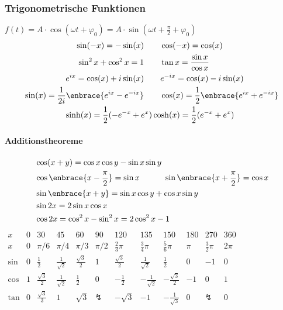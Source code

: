 \documentclass[german]{latex4ei/latex4ei_sheet}
\begin{document}
\begin{sectionbox}
    \subsubsection{Trigonometrische Funktionen}
    $f(t)=A\cdot \cos(\omega t + \varphi_0)=A\cdot \sin(\omega t + \frac{\pi}{2}+ \varphi_0)$
    \begin{eqnarray*}
        \sin (-x) = -\sin (x)  \quad & \quad \cos (-x) = \cos (x) \\
        \sin^2 x + \cos^2 x = 1  \quad & \quad \tan x = \frac{\sin x}{\cos x} \\
        e^{ix}=\cos(x)+i\sin(x) \quad & \quad e^{-ix}=\cos(x)-i\sin(x) \\
        \sin(x)=\frac{1}{2i}\enbrace{e^{ix}-e^{-ix}} \quad & \quad \cos(x)=\frac{1}{2}\enbrace{e^{ix}+e^{-ix}} \\
        \sinh(x)=\frac{1}{2}(-e^{-x}+e^x) & \cosh(x)=\frac{1}{2}(e^{-x}+e^x)
    \end{eqnarray*}
    \paragraph{Additionstheoreme} %
    \label{par:additionstheoreme}
     \begin{eqnarray*}
         & \cos (x + y) = \cos x \cos y - \sin x \sin y \\
        & \cos \enbrace{x - \frac{\pi}{2}} = \sin x \qquad \quad \sin \enbrace{x + \frac{\pi}{2}} = \cos x \\
        & \sin \enbrace{x + y} = \sin x \cos y + \cos x \sin y \\
    & 	\sin 2x = 2 \sin x \cos x        \\
        & \cos 2x = \cos^2 x - \sin^2 x = 2\cos^2 x - 1\\
     \end{eqnarray*}
    \hspace{-20pt}
    \scalebox{0.77}
    {
    $\begin{array}{c|c|c|c|c|c|c|c|c|c|c|c}
    x & 0& 30 & 45& 60 & 90 & 120 & 135& 150& 180 & 270 & 360 \\ \hline
    x & 0 & \pi / 6 & \pi / 4 & \pi / 3 & \pi / 2 & \frac{2}{3}\pi& \frac{3}{4}\pi& \frac{5}{6}\pi& \pi  & \frac{3}{2}\pi & 2 \pi \\ \hline
    \sin & 0 & \frac{1}{2} & \frac{1}{\sqrt{2}} & \frac{\sqrt 3}{2} & 1 & \frac{\sqrt 3}{2} & \frac{1}{\sqrt{2}} & \frac{1}{2} & 0 & -1 & 0 \\
    \cos & 1 & \frac{\sqrt 3}{2} & \frac{1}{\sqrt 2} & \frac{1}{2} & 0 & -\frac{1}{2} & -\frac{1}{\sqrt 2}  & -\frac{\sqrt 3}{2}   & -1 & 0 & 1 \\
    \tan & 0 & \frac{\sqrt{3}}{3}&1 &\sqrt{3} & \lightning & -\sqrt{3}& -1& -\frac{1}{\sqrt{3}} & 0 & \lightning & 0\\
    \end{array}$
    }
    

\end{sectionbox}
\end{document}
